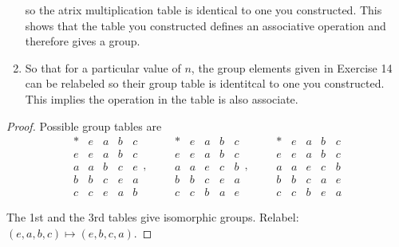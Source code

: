 \begin{exercise}
\begin{enumerate}[label={\textbf{\alph*}}]
              so the atrix multiplication table is identical to one you constructed. This shows that the table you constructed defines an associative operation and therefore gives a group.
        \item So that for a particular value of $n$, the group elements given in Exercise 14 can be relabeled so their group table is identitcal to one you constructed. This implies the operation in the table is also associate.
    \end{enumerate}
\end{exercise}

\begin{proof}
    Possible group tables are
    \[
        \begin{array}{c|cccc}
            * & e & a & b & c \\
            \hline
            e & e & a & b & c \\
            a & a & b & c & e \\
            b & b & c & e & a \\
            c & c & e & a & b
        \end{array},\qquad
        \begin{array}{c|cccc}
            * & e & a & b & c \\
            \hline
            e & e & a & b & c \\
            a & a & e & c & b \\
            b & b & c & e & a \\
            c & c & b & a & e
        \end{array},\qquad
        \begin{array}{c|cccc}
            * & e & a & b & c \\
            \hline
            e & e & a & b & c \\
            a & a & e & c & b \\
            b & b & c & a & e \\
            c & c & b & e & a
        \end{array}
    \]

    The 1st and the 3rd tables give isomorphic groups. Relabel: $(e, a, b, c)\mapsto (e, b, c, a)$.


\end{proof}
